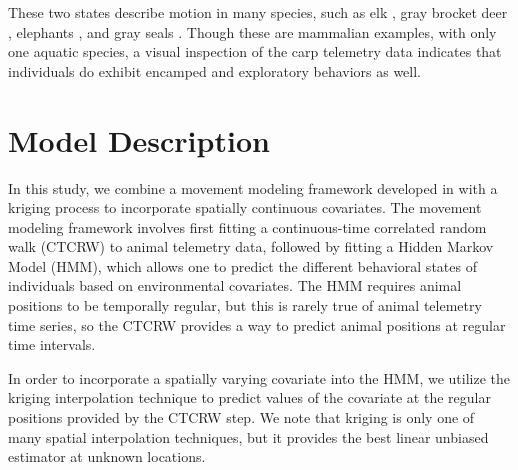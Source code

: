 \documentclass[12pt]{article}
\begin{document}
	These two states describe motion in many species, such as elk \cite{Morales2004, Fryxell2008}, gray brocket deer \cite{Grotta-Neto2019}, elephants \cite{Roever2014, Vogel2019}, and gray seals \cite{Breed2009}. Though these are mammalian examples, with only one aquatic species, a visual inspection of the carp telemetry data indicates that individuals do exhibit encamped and exploratory behaviors as well.
	
	\section{Model Description} \label{sec:model-description}
	
	
	
	In this study, we combine a movement modeling framework developed in \cite{Johnson2008, McClintock2012, Michelot2016, Whoriskey2017, McClintock2018} with a kriging process to incorporate spatially continuous covariates. The movement modeling framework involves first fitting a continuous-time correlated random walk (CTCRW) to animal telemetry data, followed by fitting a Hidden Markov Model (HMM), which allows one to predict the different behavioral states of individuals based on environmental covariates. The HMM requires animal positions to be temporally regular, but this is rarely true of animal telemetry time series, so the CTCRW provides a way to predict animal positions at regular time intervals.
	
	 In order to incorporate a spatially varying covariate into the HMM, we utilize the kriging interpolation technique to predict values of the covariate at the regular positions provided by the CTCRW step. We note that kriging is only one of many spatial interpolation techniques, but it provides the best linear unbiased estimator at unknown locations.
	
\end{document}
